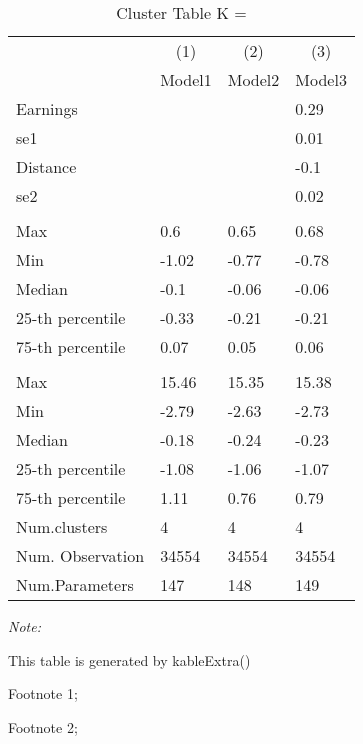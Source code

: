 \begin{table}
\centering
\caption{Cluster Table K = }
\centering
\begin{threeparttable}
\begin{tabular}[t]{llll}
\toprule
\multicolumn{1}{c}{ } & \multicolumn{1}{c}{(1)} & \multicolumn{1}{c}{(2)} & \multicolumn{1}{c}{(3)} \\
\cmidrule(l{3pt}r{3pt}){2-2} \cmidrule(l{3pt}r{3pt}){3-3} \cmidrule(l{3pt}r{3pt}){4-4}
 & Model1 & Model2 & Model3\\
\midrule
Earnings &  &  & 0.29\\
se1 &  &  & 0.01\\
Distance &  &  & -0.1\\
se2 &  &  & 0.02\\
\addlinespace[0.3em]
\multicolumn{4}{l}{\textit{\textbf{Panel A: }}}\\
\hspace{1em}Max & 0.6 & 0.65 & 0.68\\
\hspace{1em}Min & -1.02 & -0.77 & -0.78\\
\hspace{1em}Median & -0.1 & -0.06 & -0.06\\
\hspace{1em}25-th percentile & -0.33 & -0.21 & -0.21\\
\hspace{1em}75-th percentile & 0.07 & 0.05 & 0.06\\
\addlinespace[0.3em]
\multicolumn{4}{l}{\textit{\textbf{Panel B: }}}\\
\hspace{1em}Max & 15.46 & 15.35 & 15.38\\
\hspace{1em}Min & -2.79 & -2.63 & -2.73\\
\hspace{1em}Median & -0.18 & -0.24 & -0.23\\
\hspace{1em}25-th percentile & -1.08 & -1.06 & -1.07\\
\hspace{1em}75-th percentile & 1.11 & 0.76 & 0.79\\
Num.clusters & 4 & 4 & 4\\
Num. Observation & 34554 & 34554 & 34554\\
Num.Parameters & 147 & 148 & 149\\
\bottomrule
\end{tabular}
\begin{tablenotes}
\item \textit{Note: } 
\item This table is generated by kableExtra()
\item[1] Footnote 1; 
\item[2] Footnote 2; 
\end{tablenotes}
\end{threeparttable}
\end{table}
